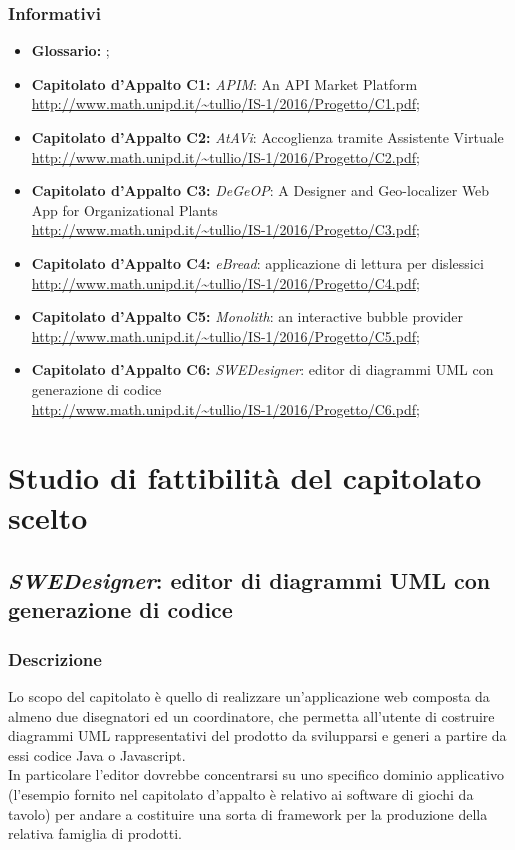 		\subsubsection{Informativi}
		\begin{itemize}
			\item \textbf{Glossario: }\emph{\Glossario};
			\item \textbf{Capitolato d'Appalto C1:} \emph{APIM}: An API Market Platform
			\\ \url{http://www.math.unipd.it/~tullio/IS-1/2016/Progetto/C1.pdf};
			\item \textbf{Capitolato d'Appalto C2:} \emph{AtAVi}: Accoglienza tramite Assistente Virtuale
			\\ \url{http://www.math.unipd.it/~tullio/IS-1/2016/Progetto/C2.pdf};
			\item \textbf{Capitolato d'Appalto C3:} \emph{DeGeOP}: A Designer and Geo-localizer Web App for Organizational Plants
			\\ \url{http://www.math.unipd.it/~tullio/IS-1/2016/Progetto/C3.pdf};
			\item \textbf{Capitolato d'Appalto C4:} \emph{eBread}: applicazione di lettura per dislessici
			\\ \url{http://www.math.unipd.it/~tullio/IS-1/2016/Progetto/C4.pdf};
			\item \textbf{Capitolato d'Appalto C5:} \emph{Monolith}: an interactive bubble provider
			\\ \url{http://www.math.unipd.it/~tullio/IS-1/2016/Progetto/C5.pdf};
			\item \textbf{Capitolato d'Appalto C6:} \emph{SWEDesigner}: editor di diagrammi UML con generazione di codice
			\\ \url{http://www.math.unipd.it/~tullio/IS-1/2016/Progetto/C6.pdf};
		\end{itemize}
\newpage
	
\section{Studio di fattibilità del capitolato scelto}
	\subsection{\emph{SWEDesigner}: editor di diagrammi UML con generazione di codice}
		\subsubsection{Descrizione}
		Lo scopo del capitolato è quello di realizzare un'applicazione web composta da almeno due disegnatori
		ed un coordinatore, che permetta all'utente di costruire diagrammi UML rappresentativi del prodotto da svilupparsi e generi a partire da essi codice 
		Java o Javascript.
		\\In particolare l'editor dovrebbe concentrarsi su uno specifico dominio applicativo (l'esempio fornito nel capitolato d'appalto è relativo ai software 
		di giochi da tavolo) per andare a costituire una sorta di framework per la produzione della relativa famiglia di prodotti.
